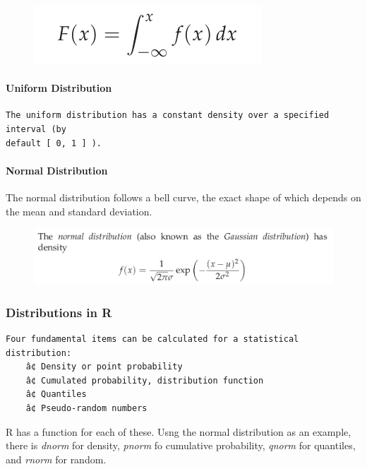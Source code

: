 \documentclass[]{article}
\let\oldparagraph\paragraph
\renewcommand{\paragraph}[1]{\oldparagraph{#1}\mbox{}}
\begin{document}
\begin{figure}
\centering
\includegraphics{img/continous.png}
\caption{}
\end{figure}

\paragraph{Uniform Distribution}\label{uniform-distribution}

\begin{verbatim}
The uniform distribution has a constant density over a specified interval (by
default [ 0, 1 ] ).
\end{verbatim}

\paragraph{Normal Distribution}\label{normal-distribution}

The normal distribution follows a bell curve, the exact shape of which
depends on the mean and standard deviation.

\begin{figure}
\centering
\includegraphics{img/normal.png}
\caption{}
\end{figure}

\subsubsection{Distributions in R}\label{distributions-in-r}

\begin{verbatim}
Four fundamental items can be calculated for a statistical distribution:
    â¢ Density or point probability
    â¢ Cumulated probability, distribution function
    â¢ Quantiles
    â¢ Pseudo-random numbers
\end{verbatim}

R has a function for each of these. Usng the normal distribution as an
example, there is \emph{dnorm} for density, \emph{pnorm} fo cumulative
probability, \emph{qnorm} for quantiles, and \emph{rnorm} for random.
\end{document}
